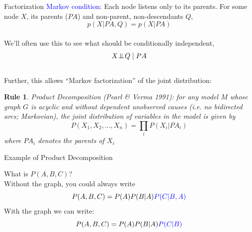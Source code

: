 \documentclass[xcolor=dvipsnames]{beamer}
\newtheorem{arule}{Rule}
\newcommand{\indep}{{\bot\negthickspace\negthickspace\bot}}
\begin{document}
\begin{frame}{Factorization}
\small
\textcolor{blue}{Markov condition}: Each node listens only to its parents. For some node $X$, its parents ($PA$) and non-parent, non-descendants $Q$, 
$$p(X|PA, Q) = p(X|PA)$$\\
\medskip
{} We'll often use this to see what should be conditionally independent,  
\[ X \indep Q \mid PA  \]\\

 Further, this allows ``Markov factorization'' of the joint distribution:
\begin{arule}
\footnotesize
Product Decomposition (Pearl \& Verma 1991):  for any model $M$ whose graph $G$ is acyclic and without dependent unobserved causes (i.e. no bidirected arcs; Markovian), the joint distribution of variables in the model is given by
\[ P(X_1, X_2, ... , X_n) =  \prod_i P(X_i | PA_i)  \]
where $PA_i$ denotes the parents of $X_i$
\end{arule}
\end{frame}

\begin{frame}{Example of Product Decomposition}
\begin{center}
\end{center}

\small
What is $P(A,B,C)$?  \\
\medskip
{} Without the graph, you could always write
\[ P(A, B, C) = P(A) P(B|A) \textcolor{blue}{P(C|B, A)}  \] 
\medskip 
{} With the graph we can write:\\
\[ P(A, B, C) = P(A) P(B|A) \textcolor{blue}{P(C|B)}  \] 
\end{frame}
\end{document}
